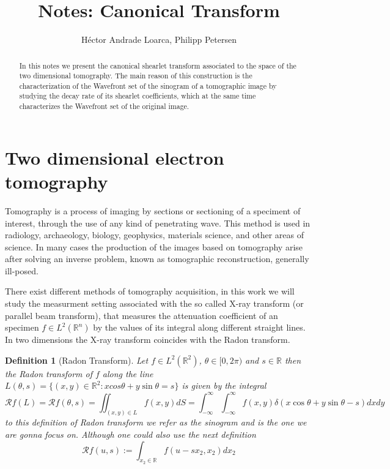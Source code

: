 \documentclass[a4paper]{article}
\title{Notes: Canonical Transform}
\author{Héctor Andrade Loarca, Philipp Petersen}
\newtheorem{definition}{Definition}
\begin{document}
\maketitle

\begin{abstract}
In this notes we present the canonical shearlet transform associated to the space of the two dimensional tomography. The main reason of this construction is the characterization of the Wavefront set of the sinogram of a tomographic image by studying the decay rate of its shearlet coefficients, which at the same time characterizes the Wavefront set of the original image. 
\end{abstract}

\section{Two dimensional electron tomography}

Tomography is a process of imaging by sections or sectioning of a speciment of interest, through the use of any kind of penetrating wave. This method is used in radiology, archaeology, biology, geophysics, materials science, and other areas of science. In many cases the production of the images based on tomography arise after solving an inverse problem, known as tomographic reconstruction, generally ill-posed. 

\bigskip

There exist different methods of tomography acquisition, in this work we will study the measurment setting associated with the so called X-ray transform (or parallel beam transform), that measures the attenuation coefficient of an specimen $f\in L^2(\mathbb{R}^n)$ by the values of its integral along different straight lines. In two dimensions the X-ray transform coincides with the Radon transform.

\begin{definition}[Radon Transform]
\label{Radondef}
Let $f\in L^2(\mathbb{R}^2)$, $\theta\in [0,2\pi)$ and $s\in\mathbb{R}$ then the Radon transform of $f$ along the line $L(\theta,s) = \{ (x,y)\in\mathbb{R}^2 : x cos\theta + y \sin\theta = s\}$ is given by the integral
\begin{equation}
\label{eq:Radoneq1}
\mathcal{R}f (L)=\mathcal{R}f(\theta,s)=\iint_{(x,y)\in L} f(x,y)dS = \int_{-\infty}^{\infty}\int_{-\infty}^{\infty} f(x,y) \delta (x\cos\theta+y\sin\theta-s)dxdy
\end{equation}
to this definition of Radon transform we refer as the sinogram and is the one we are gonna focus on. Although one could also use the next definition
\begin{equation}
\label{eq:Radoneq2}
\mathcal{R}  f(u,s) := \int_{x_2\in\mathbb{R}} f(u-sx_2,x_2)dx_2
\end{equation}
\end{definition}
\end{document}
